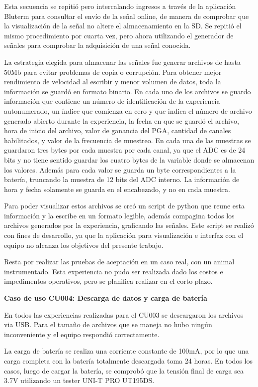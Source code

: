 Esta secuencia se repitió pero intercalando ingresos a través de la aplicación Bluterm para consultar el envío de la señal online, de manera de comprobar que la visualización de la señal no altere el almacenamiento en la SD.
Se repitió el mismo procedimiento por cuarta vez, pero ahora utilizando el generador de señales para comprobar la adquisición de una señal conocida. 

La estrategia elegida para almacenar las señales fue generar archivos de hasta 50Mb para evitar problemas de copia o corrupción. Para obtener mejor rendimiento de velocidad al escribir y menor volumen de datos, toda la información se guardó en formato binario. En cada uno de los archivos se guardo información que contiene un número de identificación de la experiencia autonumerado, un índice que comienza en cero y que indica el número de archivo generado abierto durante la experiencia, la fecha en que se guardó el archivo, hora de inicio del archivo, valor de ganancia del PGA, cantidad de canales habilitados, y valor de la frecuencia de muestreo. En cada una de las muestras se guardaron tres bytes por cada muestra por cada canal, ya que el ADC es de 24 bits y no tiene sentido guardar los cuatro bytes de la variable donde se almacenan los valores. Además para cada valor se guarda un byte correspondientes a la batería, truncando la muestra de 12 bits del ADC interno. La información de hora y fecha solamente se guarda en el encabezado, y no en cada muestra.

Para poder visualizar estos archivos se creó un script de python que reune esta información y la escribe en un formato legible, además compagina todos los archivos generados por la experiencia, graficando las señales. Este script se realizó con fines de desarrollo, ya que la aplicación para visualización e interfaz con el equipo no alcanza los objetivos del presente trabajo. 

Resta por realizar las pruebas de aceptación en un caso real, con un animal instrumentado. Esta experiencia no pudo ser realizada dado los costos e impedimentos operativos, pero se planifica realizar en el corto plazo.

\textbf{Caso de uso CU004: Descarga de datos y carga de batería}

En todos las experiencias realizadas para el CU003 se descargaron los archivos via USB. Para el tamaño de archivos que se maneja no hubo ningún inconveniente y el equipo respondió correctamente.

La carga de batería se realiza una corriente constante de 100mA, por lo que una carga completa con la batería totalmente descargada toma 24 horas. En todos los casos, luego de cargar la batería, se comprobó que la tensión final de carga sea 3.7V utilizando un tester UNI-T PRO UT195DS. 


